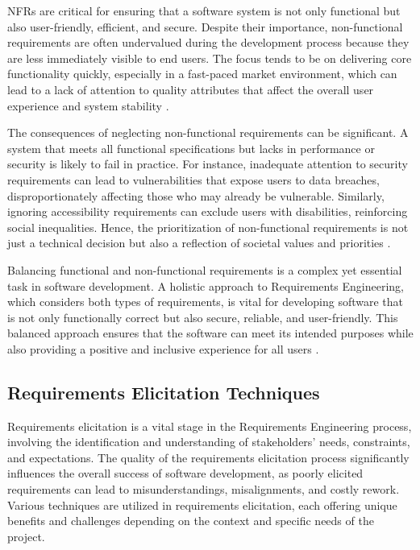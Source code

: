 \begin{refsection}
NFRs are critical for ensuring that a software system is not only functional but also user-friendly, efficient, and secure. Despite their importance, non-functional requirements are often undervalued during the development process because they are less immediately visible to end users. The focus tends to be on delivering core functionality quickly, especially in a fast-paced market environment, which can lead to a lack of attention to quality attributes that affect the overall user experience and system stability \cite[pp.~130-160]{sommerville2016software}.

The consequences of neglecting non-functional requirements can be significant. A system that meets all functional specifications but lacks in performance or security is likely to fail in practice. For instance, inadequate attention to security requirements can lead to vulnerabilities that expose users to data breaches, disproportionately affecting those who may already be vulnerable. Similarly, ignoring accessibility requirements can exclude users with disabilities, reinforcing social inequalities. Hence, the prioritization of non-functional requirements is not just a technical decision but also a reflection of societal values and priorities \cite[pp.~211-232]{ghezzi2011fundamentals}.

Balancing functional and non-functional requirements is a complex yet essential task in software development. A holistic approach to Requirements Engineering, which considers both types of requirements, is vital for developing software that is not only functionally correct but also secure, reliable, and user-friendly. This balanced approach ensures that the software can meet its intended purposes while also providing a positive and inclusive experience for all users \cite[pp.~13-32]{nuseibeh2010requirements}.

\subsection{Requirements Elicitation Techniques}

Requirements elicitation is a vital stage in the Requirements Engineering process, involving the identification and understanding of stakeholders' needs, constraints, and expectations. The quality of the requirements elicitation process significantly influences the overall success of software development, as poorly elicited requirements can lead to misunderstandings, misalignments, and costly rework. Various techniques are utilized in requirements elicitation, each offering unique benefits and challenges depending on the context and specific needs of the project.


\end{refsection}
